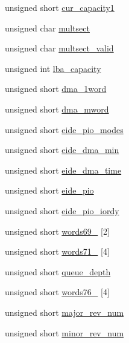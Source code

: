 \begin{DoxyCompactItemize}
unsigned short \hyperlink{structident__device__t_ae60fada7975afcb92375bd112a7103ad}{cur\+\_\+capacity1}
\item 
unsigned char \hyperlink{structident__device__t_a3be5a1bc892f8c1a4565d2a5a604a19e}{multsect}
\item 
unsigned char \hyperlink{structident__device__t_a6749281572514b27f7e71126f9f8df1c}{multsect\+\_\+valid}
\item 
unsigned int \hyperlink{structident__device__t_a81cce22064b24fead62dc0b8b1a8ea3d}{lba\+\_\+capacity}
\item 
unsigned short \hyperlink{structident__device__t_a478243c429923306e486400604e8bdee}{dma\+\_\+1word}
\item 
unsigned short \hyperlink{structident__device__t_a125ef700c585b4f13f3ed51f9808ec19}{dma\+\_\+mword}
\item 
unsigned short \hyperlink{structident__device__t_aa47dec5c44da729522f14edc7ca02f8b}{eide\+\_\+pio\+\_\+modes}
\item 
unsigned short \hyperlink{structident__device__t_ac9b15de363f7fe0dcc8ca3c1a5bc9989}{eide\+\_\+dma\+\_\+min}
\item 
unsigned short \hyperlink{structident__device__t_a3f67d5fd310f8f431fe807350616878f}{eide\+\_\+dma\+\_\+time}
\item 
unsigned short \hyperlink{structident__device__t_a6dc57a8c2a8ba3ce73ad1d48a8c22178}{eide\+\_\+pio}
\item 
unsigned short \hyperlink{structident__device__t_a5dda74b9cc6f4458e81f91cb2b1d6a1d}{eide\+\_\+pio\+\_\+iordy}
\item 
unsigned short \hyperlink{structident__device__t_a18de334971e876ab5fb98bbeee82805a}{words69\+\_} \mbox{[}2\mbox{]}
\item 
unsigned short \hyperlink{structident__device__t_ae94ab7c98a95dea40ac23a93b24be1fa}{words71\+\_} \mbox{[}4\mbox{]}
\item 
unsigned short \hyperlink{structident__device__t_ac1f7e4bfd3701c7823bec39bafa1292b}{queue\+\_\+depth}
\item 
unsigned short \hyperlink{structident__device__t_a49b7f672d60d273ea4c6b12b45677bab}{words76\+\_} \mbox{[}4\mbox{]}
\item 
unsigned short \hyperlink{structident__device__t_abece23d6f89f4a6baa5f961b9c265e8c}{major\+\_\+rev\+\_\+num}
\item 
unsigned short \hyperlink{structident__device__t_a32613085d76e1845af675c4559dd4288}{minor\+\_\+rev\+\_\+num}
\item 

\end{DoxyCompactItemize}
